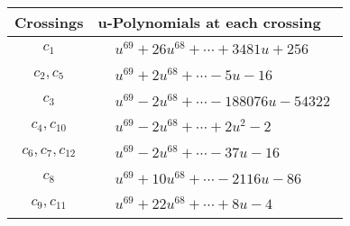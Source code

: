 \documentclass[1p]{elsarticle_modified}
\theoremstyle{definition}
\begin{document}
\begin{tabular}{m{50pt}|m{274pt}}
Crossings & \hspace{64pt}u-Polynomials at each crossing \\
\hline $$\begin{aligned}c_{1}\end{aligned}$$&$\begin{aligned}
&u^{69}+26 u^{68}+\cdots+3481 u+256
\end{aligned}$\\
\hline $$\begin{aligned}c_{2},c_{5}\end{aligned}$$&$\begin{aligned}
&u^{69}+2 u^{68}+\cdots-5 u-16
\end{aligned}$\\
\hline $$\begin{aligned}c_{3}\end{aligned}$$&$\begin{aligned}
&u^{69}-2 u^{68}+\cdots-188076 u-54322
\end{aligned}$\\
\hline $$\begin{aligned}c_{4},c_{10}\end{aligned}$$&$\begin{aligned}
&u^{69}-2 u^{68}+\cdots+2 u^2-2
\end{aligned}$\\
\hline $$\begin{aligned}c_{6},c_{7},c_{12}\end{aligned}$$&$\begin{aligned}
&u^{69}-2 u^{68}+\cdots-37 u-16
\end{aligned}$\\
\hline $$\begin{aligned}c_{8}\end{aligned}$$&$\begin{aligned}
&u^{69}+10 u^{68}+\cdots-2116 u-86
\end{aligned}$\\
\hline $$\begin{aligned}c_{9},c_{11}\end{aligned}$$&$\begin{aligned}
&u^{69}+22 u^{68}+\cdots+8 u-4
\end{aligned}$\\
\hline
\end{tabular}\\~\\
\newpage\renewcommand{\arraystretch}{1}
\end{document}
